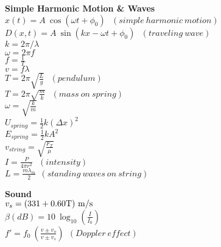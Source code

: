\documentclass[12pt]{article}
\begin{document}
\begin{twocolumn}
\begin{flushleft}
\bigskip
{\bf Simple Harmonic Motion \& Waves} \\
\bigskip
$\displaystyle x(t) = A~ \cos(\omega t + \phi_0)~~~(simple~harmonic~motion)$\\
\medskip
$\displaystyle D(x,t) = A~ \sin(k x - \omega t + \phi_0)~~~(traveling~wave)$\\
\medskip
$\displaystyle k = 2 \pi / \lambda $ \\
\medskip
$\displaystyle \omega = 2 \pi f $ \\
\medskip
$\displaystyle f = \frac{1}{T} $ \\
\medskip
$\displaystyle v = f \lambda $ \\
\medskip
$\displaystyle T = 2 \pi \sqrt{\frac{L}{g}}  ~~~(pendulum)$\\
\medskip
$\displaystyle T = 2 \pi \sqrt{\frac{m}{k}} ~~~(mass \ on\  spring)$\\
\medskip
$\displaystyle \omega = \sqrt{\frac{k}{m}} $\\
\medskip
$\displaystyle U_{spring} = \frac{1}{2} k (\Delta x)^2$\\
\medskip
$\displaystyle E_{spring} = \frac{1}{2} k A^2$\\
\medskip
$\displaystyle v_{string} = \sqrt{\frac{F_T}{\mu}} $ \\
\medskip
$\displaystyle I = \frac{P}{4 \pi r^2} ~~~(intensity)$ \\
\medskip
$\displaystyle L = \frac{m \lambda_m}{2} ~~(standing ~ waves ~ on ~ 
string)$ \\ 
\medskip

{\bf Sound} \\
\bigskip
$\displaystyle v_s = (331 + 0.60 \rm T)~\rm m/s$ \\
\medskip
$\displaystyle \beta (dB) = 10~\log_{10}\left(\frac{I}{I_0}\right) $ \\ 
\medskip
$\displaystyle f' = f_0~ \left(\frac{v \pm v_o}{v \pm
  v_s}\right)~~(Doppler~effect)$ 
\\ 
\bigskip


\end{flushleft}
\end{twocolumn}
\end{document}
